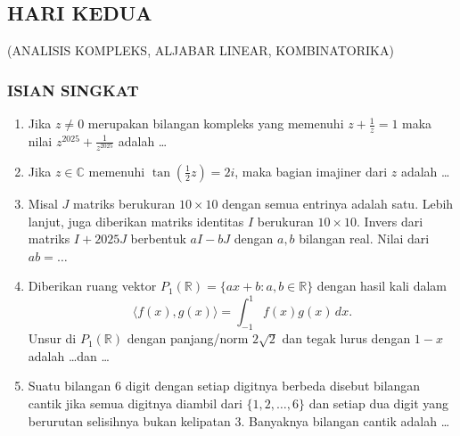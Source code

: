 \documentclass[12pt,twoside]{article}
\begin{document}
\newpage
\subsection{HARI KEDUA}
\begin{center}
	(ANALISIS KOMPLEKS, ALJABAR LINEAR, KOMBINATORIKA)
\end{center}
\subsubsection*{ISIAN SINGKAT}
\begin{enumerate}
	\item Jika $z \ne 0$ merupakan bilangan kompleks yang memenuhi
	      $
		      z + \frac{1}{z} = 1
	      $
	      maka nilai
	      $
		      z^{2025} + \frac{1}{z^{2025}}
	      $
	      adalah \dots

	\item Jika $z \in \mathbb{C}$ memenuhi $\tan\!\left(\tfrac{1}{2}z\right)=2i$, maka bagian imajiner dari $z$ adalah \dots

	\item Misal $J$ matriks berukuran $10\times 10$ dengan semua entrinya adalah satu.
	      Lebih lanjut, juga diberikan matriks identitas $I$ berukuran $10\times 10$.
	      Invers dari matriks $I + 2025 J$ berbentuk $aI - bJ$ dengan $a,b$ bilangan real.
	      Nilai dari $ab = \dots$

	\item Diberikan ruang vektor $P_1(\mathbb{R}) = \{ ax + b : a,b \in \mathbb{R} \}$
	      dengan hasil kali dalam
	      \[
		      \langle f(x), g(x) \rangle = \int_{-1}^{1} f(x) g(x)\, dx.
	      \]
	      Unsur di $P_1(\mathbb{R})$ dengan panjang/norm $2\sqrt{2}$ dan tegak lurus dengan $1-x$ adalah \dots dan \dots

	\item Suatu bilangan 6 digit dengan setiap digitnya berbeda disebut bilangan cantik jika semua digitnya diambil dari
	      $\{1,2,\dots,6\}$ dan setiap dua digit yang berurutan selisihnya bukan kelipatan 3.
	      Banyaknya bilangan cantik adalah \dots
\end{enumerate}
\end{document}
